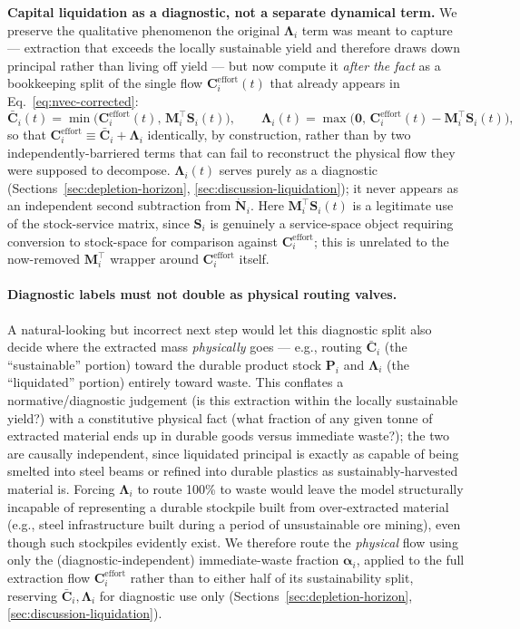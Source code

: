 \documentclass[twocolumn,10pt]{article}
\begin{document}
\textbf{Capital liquidation as a diagnostic, not a separate dynamical term.} We preserve the qualitative phenomenon the original $\boldsymbol\Lambda_i$ term was meant to capture — extraction that exceeds the locally sustainable yield and therefore draws down principal rather than living off yield — but now compute it \emph{after the fact} as a bookkeeping split of the single flow $\mathbf C_i^{\text{effort}}(t)$ that already appears in Eq.~\eqref{eq:nvec-corrected}:
\[
\bar{\mathbf{C}}_i(t) = \min\bigl(\mathbf C_i^{\text{effort}}(t),\, \mathbf M_i^\top\mathbf S_i(t)\bigr), \qquad
\boldsymbol{\Lambda}_i(t) = \max\bigl(\mathbf 0,\, \mathbf C_i^{\text{effort}}(t) - \mathbf M_i^\top\mathbf S_i(t)\bigr),
\]
so that $\mathbf C_i^{\text{effort}}\equiv\bar{\mathbf C}_i+\boldsymbol\Lambda_i$ identically, by construction, rather than by two independently-barriered terms that can fail to reconstruct the physical flow they were supposed to decompose. $\boldsymbol\Lambda_i(t)$ serves purely as a diagnostic (Sections~\ref{sec:depletion-horizon}, \ref{sec:discussion-liquidation}); it never appears as an independent second subtraction from $\dot{\mathbf N}_i$. Here $\mathbf M_i^\top\mathbf S_i(t)$ is a legitimate use of the stock-service matrix, since $\mathbf S_i$ is genuinely a service-space object requiring conversion to stock-space for comparison against $\mathbf C_i^{\text{effort}}$; this is unrelated to the now-removed $\mathbf M_i^\top$ wrapper around $\mathbf C_i^{\text{effort}}$ itself.

\paragraph{Diagnostic labels must not double as physical routing valves.} A natural-looking but incorrect next step would let this diagnostic split also decide where the extracted mass \emph{physically} goes — e.g., routing $\bar{\mathbf C}_i$ (the ``sustainable'' portion) toward the durable product stock $\mathbf P_i$ and $\boldsymbol\Lambda_i$ (the ``liquidated'' portion) entirely toward waste. This conflates a normative/diagnostic judgement (is this extraction within the locally sustainable yield?) with a constitutive physical fact (what fraction of any given tonne of extracted material ends up in durable goods versus immediate waste?); the two are causally independent, since liquidated principal is exactly as capable of being smelted into steel beams or refined into durable plastics as sustainably-harvested material is. Forcing $\boldsymbol\Lambda_i$ to route 100\% to waste would leave the model structurally incapable of representing a durable stockpile built from over-extracted material (e.g., steel infrastructure built during a period of unsustainable ore mining), even though such stockpiles evidently exist. We therefore route the \emph{physical} flow using only the (diagnostic-independent) immediate-waste fraction $\boldsymbol\alpha_i$, applied to the full extraction flow $\mathbf C_i^{\text{effort}}$ rather than to either half of its sustainability split, reserving $\bar{\mathbf C}_i,\boldsymbol\Lambda_i$ for diagnostic use only (Sections~\ref{sec:depletion-horizon}, \ref{sec:discussion-liquidation}).
\end{document}
